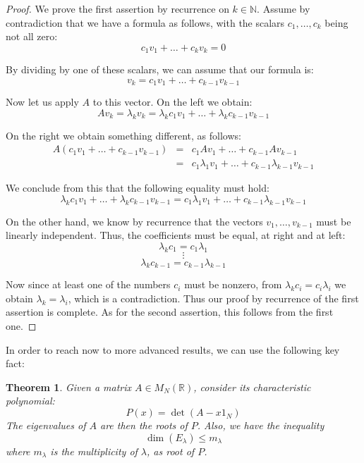 \documentclass[12pt]{amsbook}
\newtheorem{theorem}{Theorem}[chapter]
\begin{document}
\begin{proof}
We prove the first assertion by recurrence on $k\in\mathbb N$. Assume by contradiction that we have a formula as follows, with the scalars $c_1,\ldots,c_k$ being not all zero:
$$c_1v_1+\ldots+c_kv_k=0$$

By dividing by one of these scalars, we can assume that our formula is:
$$v_k=c_1v_1+\ldots+c_{k-1}v_{k-1}$$

Now let us apply $A$ to this vector. On the left we obtain:
$$Av_k
=\lambda_kv_k
=\lambda_kc_1v_1+\ldots+\lambda_kc_{k-1}v_{k-1}$$

On the right we obtain something different, as follows:
\begin{eqnarray*}
A(c_1v_1+\ldots+c_{k-1}v_{k-1})
&=&c_1Av_1+\ldots+c_{k-1}Av_{k-1}\\
&=&c_1\lambda_1v_1+\ldots+c_{k-1}\lambda_{k-1}v_{k-1}
\end{eqnarray*}

We conclude from this that the following equality must hold:
$$\lambda_kc_1v_1+\ldots+\lambda_kc_{k-1}v_{k-1}=c_1\lambda_1v_1+\ldots+c_{k-1}\lambda_{k-1}v_{k-1}$$

On the other hand, we know by recurrence that the vectors $v_1,\ldots,v_{k-1}$ must be linearly independent. Thus, the coefficients must be equal, at right and at left:
$$\lambda_kc_1=c_1\lambda_1$$
$$\vdots$$
$$\lambda_kc_{k-1}=c_{k-1}\lambda_{k-1}$$

Now since at least one of the numbers $c_i$ must be nonzero, from $\lambda_kc_i=c_i\lambda_i$ we obtain $\lambda_k=\lambda_i$, which is a contradiction. Thus our proof by recurrence of the first assertion is complete. As for the second assertion, this follows from the first one.
\end{proof}

In order to reach now to more advanced results, we can use the following key fact:


\begin{theorem}
Given a matrix $A\in M_N(\mathbb R)$, consider its characteristic polynomial:
$$P(x)=\det(A-x1_N)$$
The eigenvalues of $A$ are then the roots of $P$. Also, we have the inequality
$$\dim(E_\lambda)\leq m_\lambda$$
where $m_\lambda$ is the multiplicity of $\lambda$, as root of $P$.
\end{theorem}
\end{document}
